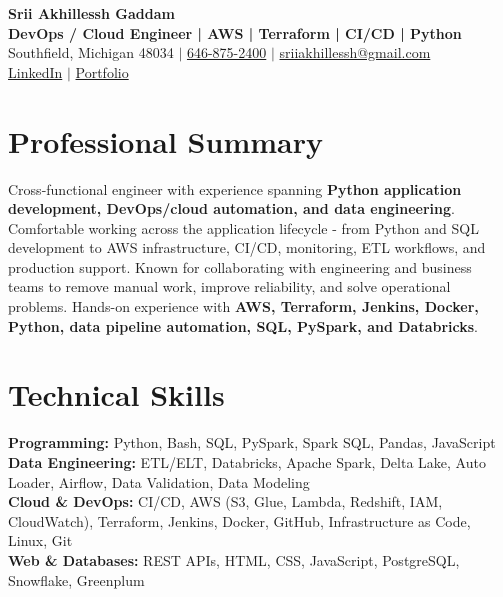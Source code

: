 \documentclass[letterpaper,10pt]{article}
\begin{document}
\fontsize{9.35pt}{10.45pt}\selectfont

\begin{center}
    {\LARGE \textbf{Srii Akhillessh Gaddam}} \\[-1pt]
    \textbf{DevOps / Cloud Engineer | AWS | Terraform | CI/CD | Python} \\[2pt]
    Southfield, Michigan 48034 $|$
    \href{tel:6468752400}{646-875-2400} $|$
    \href{mailto:sriiakhillessh@gmail.com}{sriiakhillessh@gmail.com} \\[1pt]
    \href{https://www.linkedin.com/in/srii-akhiilessh-gaddam-b48668191/}{LinkedIn} $|$
    \href{https://sriiakhillesshg.github.io/portfolio/}{Portfolio}
\end{center}
\vspace{-8pt}

\section{Professional Summary}
\small{Cross-functional engineer with experience spanning \textbf{Python application development, DevOps/cloud automation, and data engineering}. Comfortable working across the application lifecycle - from Python and SQL development to AWS infrastructure, CI/CD, monitoring, ETL workflows, and production support. Known for collaborating with engineering and business teams to remove manual work, improve reliability, and solve operational problems. Hands-on experience with \textbf{AWS, Terraform, Jenkins, Docker, Python, data pipeline automation, SQL, PySpark, and Databricks}.}

\section{Technical Skills}
\small{
\textbf{Programming:} Python, Bash, SQL, PySpark, Spark SQL, Pandas, JavaScript \\
\textbf{Data Engineering:} ETL/ELT, Databricks, Apache Spark, Delta Lake, Auto Loader, Airflow, Data Validation, Data Modeling \\
\textbf{Cloud \& DevOps:} CI/CD, AWS (S3, Glue, Lambda, Redshift, IAM, CloudWatch), Terraform, Jenkins, Docker, GitHub, Infrastructure as Code, Linux, Git \\
\textbf{Web \& Databases:} REST APIs, HTML, CSS, JavaScript, PostgreSQL, Snowflake, Greenplum
}
\end{document}
